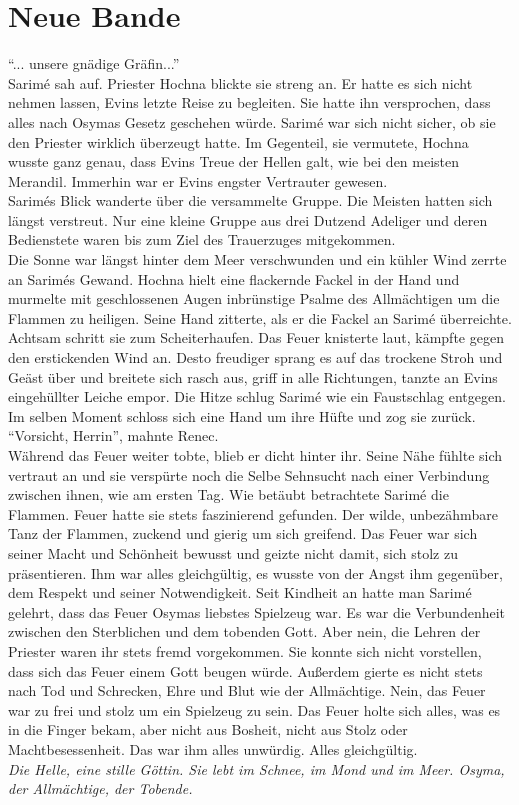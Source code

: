 
\chapter{Neue Bande}

``... unsere gnädige Gräfin...''\\
Sarimé sah auf. Priester Hochna blickte sie streng an. Er hatte es sich nicht nehmen lassen, Evins 
letzte Reise zu begleiten. Sie hatte ihn versprochen, dass alles nach Osymas Gesetz geschehen 
würde. Sarimé war sich nicht sicher, ob sie den Priester wirklich überzeugt hatte. Im Gegenteil, sie 
vermutete, Hochna wusste ganz genau, dass Evins Treue der Hellen galt, wie bei den meisten 
Merandil. Immerhin war er Evins engster Vertrauter gewesen.\\
Sarimés Blick wanderte über die versammelte Gruppe. Die Meisten hatten sich längst verstreut. Nur 
eine kleine Gruppe aus drei Dutzend Adeliger und deren Bedienstete waren bis zum Ziel des 
Trauerzuges mitgekommen.\\
Die Sonne war längst hinter dem Meer verschwunden und ein kühler Wind zerrte an Sarimés Gewand. 
Hochna hielt eine flackernde Fackel in der Hand und murmelte mit geschlossenen Augen inbrünstige 
Psalme des Allmächtigen um die Flammen zu heiligen. Seine Hand zitterte, als er die Fackel an 
Sarimé überreichte. Achtsam schritt sie zum Scheiterhaufen. Das Feuer knisterte laut, kämpfte gegen 
den erstickenden Wind an. Desto freudiger sprang es auf das trockene Stroh und Geäst über und 
breitete sich rasch aus, griff in alle Richtungen, tanzte an Evins eingehüllter Leiche empor. Die 
Hitze schlug Sarimé wie ein Faustschlag entgegen. Im selben Moment schloss sich eine Hand um ihre 
Hüfte und zog sie zurück. \\
``Vorsicht, Herrin'', mahnte Renec. \\
Während das Feuer weiter tobte, blieb er dicht hinter ihr. Seine Nähe fühlte sich vertraut an und 
sie verspürte noch die Selbe Sehnsucht nach einer Verbindung zwischen ihnen, wie am ersten Tag. Wie 
betäubt betrachtete Sarimé die Flammen. Feuer hatte sie stets faszinierend gefunden. 
Der wilde, unbezähmbare Tanz der Flammen, zuckend und gierig um sich greifend. Das Feuer war sich 
seiner Macht und Schönheit bewusst und geizte nicht damit, sich stolz zu präsentieren. Ihm war  
alles gleichgültig, es wusste von der Angst ihm gegenüber, dem Respekt und seiner Notwendigkeit. 
Seit Kindheit an hatte man Sarimé gelehrt, dass das Feuer Osymas liebstes Spielzeug war. Es war die 
Verbundenheit zwischen den Sterblichen und dem tobenden Gott. Aber nein, die Lehren der Priester 
waren ihr stets fremd vorgekommen. Sie konnte sich nicht vorstellen, dass sich das Feuer einem Gott 
beugen würde. Außerdem gierte es nicht stets nach Tod und Schrecken, Ehre und Blut wie der 
Allmächtige. Nein, das Feuer war zu frei und stolz um ein Spielzeug zu sein. Das Feuer holte sich 
alles, was es in die Finger bekam, aber nicht aus Bosheit, nicht aus Stolz oder Machtbesessenheit. 
Das war ihm alles unwürdig. Alles gleichgültig.\\
\textit{Die Helle, eine stille Göttin. Sie lebt im Schnee, im Mond und im Meer.  Osyma, der 
Allmächtige, der Tobende.}\\


